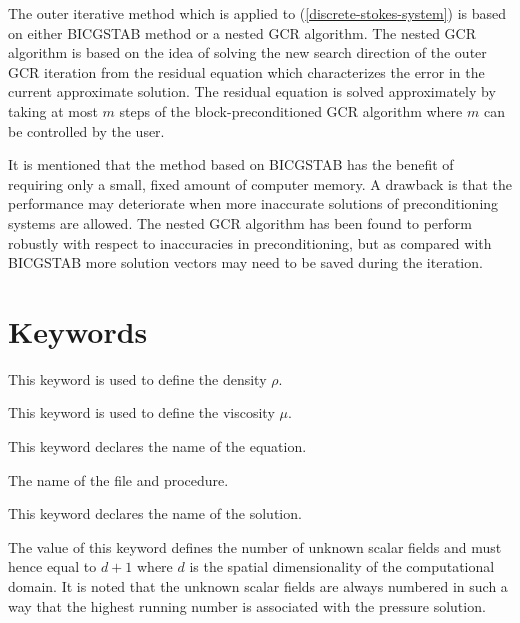 The outer iterative method which is applied to (\ref{discrete-stokes-system})
is based on either BICGSTAB method or a nested GCR algorithm.
The nested GCR algorithm is based on the idea of solving the new search direction
of the outer GCR iteration from the residual equation which characterizes the 
error in the current approximate solution. The residual equation is solved 
approximately by taking at most $m$ steps of the block-preconditioned GCR algorithm
where $m$ can be controlled by the user.

It is mentioned that 
the method based on BICGSTAB has the benefit of requiring only a small, fixed amount 
of computer memory. A drawback is that the performance may deteriorate when
more inaccurate solutions of preconditioning systems are allowed. 
The nested GCR algorithm has been found to perform robustly with respect to 
inaccuracies in preconditioning, but as compared with BICGSTAB more solution
vectors may need to be saved during the iteration.  


 
  
  
 


\section{Keywords}

\sifbegin
{}
\sifbegin
{} 
This keyword is used to define the density $\rho$.

This keyword is used to define the viscosity $\mu$.

\sifend
\sifend


\sifbegin
{}
\sifbegin

This keyword declares the name of the equation.

The name of the file and procedure.

This keyword declares the name of the solution.

The value of this keyword defines the number of unknown scalar fields
and must hence equal to $d+1$ where $d$ is the spatial 
dimensionality of the computational domain.
It is noted that the unknown scalar fields are always numbered in such a
way that the highest running number is associated with the pressure
solution. 

